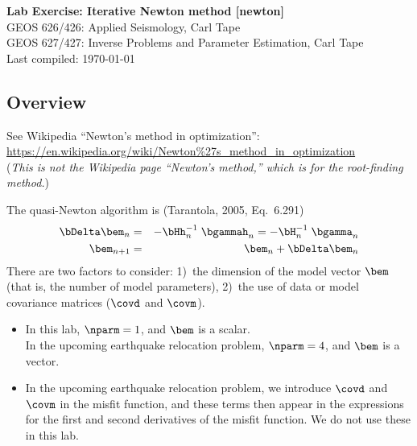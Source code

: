 \documentclass[11pt,titlepage,fleqn]{article}
\begin{document}

\begin{spacing}{1.2}
\centering
{\large \bf Lab Exercise: Iterative Newton method [newton]} \\
GEOS 626/426: Applied Seismology, Carl Tape \\
GEOS 627/427: Inverse Problems and Parameter Estimation, Carl Tape \\
Last compiled: \today
\end{spacing}


\subsection*{Overview}

See Wikipedia ``Newton's method in optimization'': \\
\url{https://en.wikipedia.org/wiki/Newton%27s_method_in_optimization} \\
({\em This is not the Wikipedia page ``Newton's method,'' which is for the root-finding method.})

\bigskip\noindent
The quasi-Newton algorithm is (\eg Tarantola, 2005, Eq.~6.291)
%
\begin{eqnarray}
\bDelta\bem_n &=& -\bHh_n^{-1}\; \bgammah_n = -\bH_n^{-1}\; \bgamma_n
\label{eq1}
\\
\bem_{n+1} &=& \bem_n + \bDelta\bem_n
\label{eq2}
\end{eqnarray}
%
There are two factors to consider:
1)~the dimension of the model vector $\bem$ (that is, the number of model parameters),
2)~the use of data or model covariance matrices ($\covd$ and $\covm$).
%
\begin{itemize}
\item In this lab, $\nparm = 1$, and $\bem$ is a scalar. \\
      In the upcoming earthquake relocation problem, $\nparm = 4$, and $\bem$ is a vector.

\item In the upcoming earthquake relocation problem, we introduce $\covd$ and $\covm$ in the misfit function, and these terms then appear in the expressions for the first and second derivatives of the misfit function. We do not use these in this lab.
\end{itemize}

\end{document}
